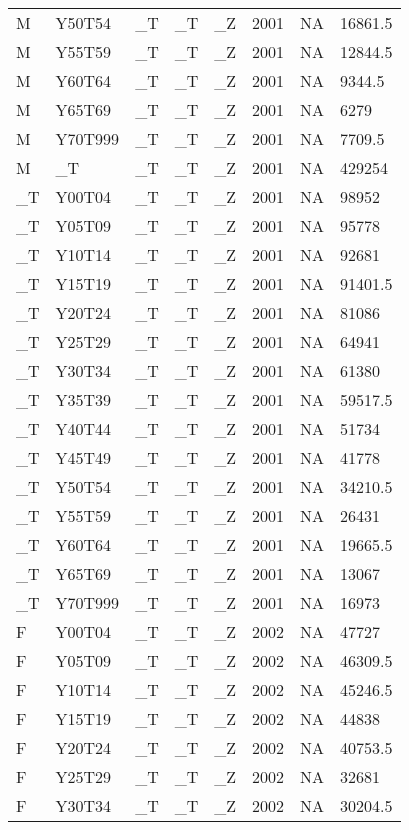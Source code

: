 \begin{longtable}[t]{llllllll}
M & Y50T54 & \_T & \_T & \_Z & 2001 & NA & 16861.5\\
M & Y55T59 & \_T & \_T & \_Z & 2001 & NA & 12844.5\\
\addlinespace
M & Y60T64 & \_T & \_T & \_Z & 2001 & NA & 9344.5\\
M & Y65T69 & \_T & \_T & \_Z & 2001 & NA & 6279\\
M & Y70T999 & \_T & \_T & \_Z & 2001 & NA & 7709.5\\
M & \_T & \_T & \_T & \_Z & 2001 & NA & 429254\\
\_T & Y00T04 & \_T & \_T & \_Z & 2001 & NA & 98952\\
\addlinespace
\_T & Y05T09 & \_T & \_T & \_Z & 2001 & NA & 95778\\
\_T & Y10T14 & \_T & \_T & \_Z & 2001 & NA & 92681\\
\_T & Y15T19 & \_T & \_T & \_Z & 2001 & NA & 91401.5\\
\_T & Y20T24 & \_T & \_T & \_Z & 2001 & NA & 81086\\
\_T & Y25T29 & \_T & \_T & \_Z & 2001 & NA & 64941\\
\addlinespace
\_T & Y30T34 & \_T & \_T & \_Z & 2001 & NA & 61380\\
\_T & Y35T39 & \_T & \_T & \_Z & 2001 & NA & 59517.5\\
\_T & Y40T44 & \_T & \_T & \_Z & 2001 & NA & 51734\\
\_T & Y45T49 & \_T & \_T & \_Z & 2001 & NA & 41778\\
\_T & Y50T54 & \_T & \_T & \_Z & 2001 & NA & 34210.5\\
\addlinespace
\_T & Y55T59 & \_T & \_T & \_Z & 2001 & NA & 26431\\
\_T & Y60T64 & \_T & \_T & \_Z & 2001 & NA & 19665.5\\
\_T & Y65T69 & \_T & \_T & \_Z & 2001 & NA & 13067\\
\_T & Y70T999 & \_T & \_T & \_Z & 2001 & NA & 16973\\
F & Y00T04 & \_T & \_T & \_Z & 2002 & NA & 47727\\
\addlinespace
F & Y05T09 & \_T & \_T & \_Z & 2002 & NA & 46309.5\\
F & Y10T14 & \_T & \_T & \_Z & 2002 & NA & 45246.5\\
F & Y15T19 & \_T & \_T & \_Z & 2002 & NA & 44838\\
F & Y20T24 & \_T & \_T & \_Z & 2002 & NA & 40753.5\\
F & Y25T29 & \_T & \_T & \_Z & 2002 & NA & 32681\\
\addlinespace
F & Y30T34 & \_T & \_T & \_Z & 2002 & NA & 30204.5\\

\end{longtable}
